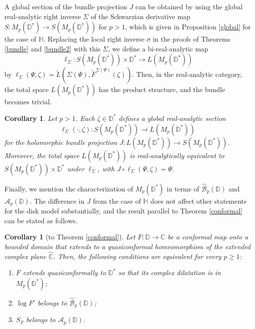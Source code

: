 \documentclass[amstex,12pt,reqno]{amsart}
\newtheorem{corollary}[theorem]{Corollary}
\theoremstyle{definition}
\begin{document}
A global section of the bundle projection $J$ can be obtained by using the global real-analytic right inverse $\Sigma$ of
the Schwarzian derivative map $S:M_p(\mathbb D^*) \to S(M_p(\mathbb D^*))$ for $p>1$,
which is given in Proposition \ref{global} for the case of $\mathbb H$.
Replacing the local right inverse $\sigma$ in the proofs of Theorems \ref{bundle} and \ref{bundle2} with this $\Sigma$,
we define a bi-real-analytic map
$$
\ell_\Sigma:S(M_p(\mathbb D^*)) \times \mathbb D^* \to L(M_p(\mathbb D^*))
$$
by
$\ell_\Sigma(\Psi, \zeta)
=\widetilde L(\Sigma(\Psi),\widetilde F^{\Sigma(\Psi)}(\zeta))$. 
Then, in
the real-analytic category, the total space $L(M_p(\mathbb D^*))$ has the product structure,
and the bundle becomes trivial. 

\begin{corollary}\label{product}
Let $p>1$.
Each $\zeta \in \mathbb D^*$ defines a global real-analytic section 
$$
\ell_\Sigma(\cdot, \zeta):S(M_p(\mathbb D^*)) \to L(M_p(\mathbb D^*))
$$
for the holomorphic bundle projection $J:L(M_p(\mathbb D^*)) \to S(M_p(\mathbb D^*))$.
Moreover, the total space $L(M_p(\mathbb D^*))$ is real-analytically equivalent to $S(M_p(\mathbb D^*)) \times \mathbb D^*$
under $\ell_\Sigma$, with $J \circ \ell_\Sigma(\Psi,\zeta)=\Psi$.
\end{corollary}

Finally, we mention the characterization of $M_p(\mathbb D^*)$ in terms of
$\widehat{\mathcal B}_p(\mathbb D)$ and $\mathcal A_p(\mathbb D)$.
The difference in $J$ from the case of $\mathbb H$ does not affect other statements for the disk model substantially, 
and the result parallel to Theorem \ref{conformal} can be stated as follows.

\begin{corollary}[to Theorem \ref{conformal}]\label{disk2}
Let $F:\mathbb D \to \mathbb C$ be a conformal map onto a bounded domain that extends to a quasiconformal
homeomorphism of the extended complex plane $\widehat{\mathbb C}$.
Then, the following conditions are equivalent for every $p \geq 1$:
\begin{enumerate}
\item
$F$ extends quasiconformally to $\mathbb D^*$ so that its complex dilatation is in $M_p(\mathbb D^*)$;
\item
$\log F'$ belongs to $\widehat{\mathcal B}_p(\mathbb D)$;
\item
$S_{F}$ belongs to ${\mathcal A}_p(\mathbb D)$.
\end{enumerate}
\end{corollary}
\end{document}

